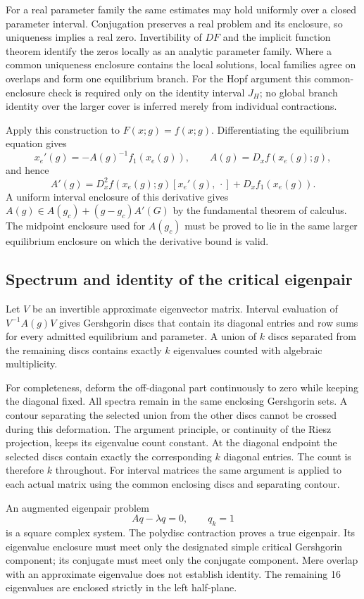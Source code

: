 \documentclass[11pt]{article}
\theoremstyle{definition}
\begin{document}
For a real parameter family the same estimates may hold uniformly over a closed parameter interval. Conjugation preserves a real problem and its enclosure, so uniqueness implies a real zero. Invertibility of $DF$ and the implicit function theorem identify the zeros locally as an analytic parameter family. Where a common uniqueness enclosure contains the local solutions, local families agree on overlaps and form one equilibrium branch. For the Hopf argument this common-enclosure check is required only on the identity interval $J_H$; no global branch identity over the larger cover is inferred merely from individual contractions.

Apply this construction to $F(x;g)=f(x;g)$. Differentiating the equilibrium equation gives
\[
 x_e'(g)=-A(g)^{-1}f_1(x_e(g)),\qquad A(g)=D_xf(x_e(g);g),
\]
and hence
\[
 A'(g)=D_x^2f(x_e(g);g)[x_e'(g),\,\cdot]+D_xf_1(x_e(g)).
\]
A uniform interval enclosure of this derivative gives
$A(g)\in A(g_c)+(g-g_c)A'(G)$ by the fundamental theorem of calculus. The midpoint enclosure used for $A(g_c)$ must be proved to lie in the same larger equilibrium enclosure on which the derivative bound is valid.

\subsection{Spectrum and identity of the critical eigenpair}\label{sec:ha-3}

Let $V$ be an invertible approximate eigenvector matrix. Interval evaluation of $V^{-1}A(g)V$ gives Gershgorin discs that contain its diagonal entries and row sums for every admitted equilibrium and parameter. A union of $k$ discs separated from the remaining discs contains exactly $k$ eigenvalues counted with algebraic multiplicity.

For completeness, deform the off-diagonal part continuously to zero while keeping the diagonal fixed. All spectra remain in the same enclosing Gershgorin sets. A contour separating the selected union from the other discs cannot be crossed during this deformation. The argument principle, or continuity of the Riesz projection, keeps its eigenvalue count constant. At the diagonal endpoint the selected discs contain exactly the corresponding $k$ diagonal entries. The count is therefore $k$ throughout. For interval matrices the same argument is applied to each actual matrix using the common enclosing discs and separating contour.

An augmented eigenpair problem
\[
 Aq-\lambda q=0,\qquad q_k=1
\]
is a square complex system. The polydisc contraction proves a true eigenpair. Its eigenvalue enclosure must meet only the designated simple critical Gershgorin component; its conjugate must meet only the conjugate component. Mere overlap with an approximate eigenvalue does not establish identity. The remaining 16 eigenvalues are enclosed strictly in the left half-plane.
\end{document}
